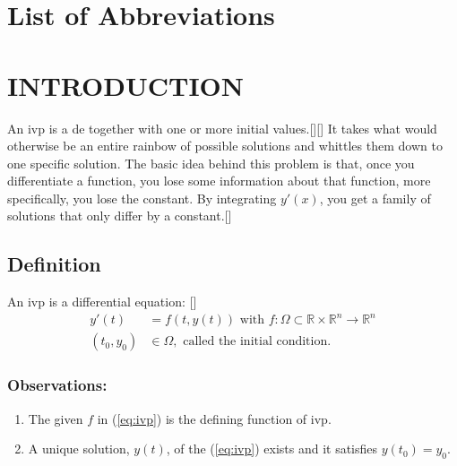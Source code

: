 \documentclass[12pt,oneside]{book}
\begin{document}
	\frontmatter
	
		
	\tableofcontents
	
	\chapter*{List of Abbreviations}
	

	\mainmatter
	
	\chapter{INTRODUCTION}
		\begin{spacing}{1.2}
			
			An \ac{ivp} is a \ac{de} together with one or more initial values.[][] It takes what would otherwise be an entire rainbow of possible solutions and whittles them down to one specific solution. The basic idea behind this problem is that, once you differentiate a function, you lose some information about that function, more specifically, you lose the constant. By integrating $ y'(x) $, you get a family of solutions that only differ by a constant.[]
			
			\section{Definition}
				An \ac{ivp} is a differential equation: []
				\begin{equation}
					\begin{split} \label{eq:ivp}
						y'(t) & = f(t, y(t)) \text{ with } f:\Omega \subset \mathbb{R} \times \mathbb{R}^n \rightarrow \mathbb{R}^n \\
						(t_{0}, y_{0}) & \in \Omega, \text{ called the initial condition.}
					\end{split}
				\end{equation}
				\subsection*{Observations: }
				\begin{enumerate}
					\item The given $ f $ in (\ref{eq:ivp}) is the defining function of \ac{ivp}.
					\item A unique solution, $ y(t) $, of the (\ref{eq:ivp}) exists and it satisfies $ y(t_{0}) = y_{0} $.
				\end{enumerate}
				

\end{spacing}
\end{document}
